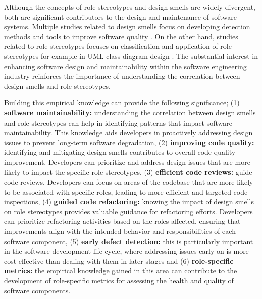 \documentclass[AMA,Times1COL]{WileyNJDv5} %
\begin{document}
Although the concepts of role-stereotypes and design smells are widely divergent, both are significant contributors to the design and maintenance of software systems. Multiple studies related to design smells focus on developing detection methods and tools to improve software quality \cite{barbez2020machine,kaur2018detecting, liu2018deep}. On the other hand, studies related to role-stereotypes focuses on classification \cite{dragan2010automatic,nurwidyantoro2019automated} and application of role-stereotypes for example in UML class diagram design \cite{kuzniarz2004empirical}. The substantial interest in enhancing software design and maintainability within the software engineering industry reinforces the importance of understanding the correlation between design smells and role-stereotypes.

 Building this empirical knowledge can provide the following significance; (1) \textbf{software maintainability:} understanding the correlation between design smells and role stereotypes can help in identifying patterns that impact software maintainability. This knowledge aids developers in proactively addressing design issues to prevent long-term software degradation, (2) \textbf{improving code quality:} identifying and mitigating design smells contributes to overall code quality improvement. Developers can prioritize and address design issues that are more likely to impact the specific role stereotypes, (3) \textbf{efficient code reviews:} guide code reviews. Developers can focus on areas of the codebase that are more likely to be associated with specific roles, leading to more efficient and targeted code inspections, (4) \textbf{guided code refactoring:} knowing the impact of design smells on role stereotypes provides valuable guidance for refactoring efforts. Developers can prioritize refactoring activities based on the roles affected, ensuring that improvements align with the intended behavior and responsibilities of each software component, (5) \textbf{early  defect detection:} this is particularly important in the software development life cycle, where addressing issues early on is more cost-effective than dealing with them in later stages and (6) \textbf{role-specific metrics:} the empirical knowledge gained in this area can contribute to the development of role-specific metrics for assessing the health and quality of software components.
\end{document}
